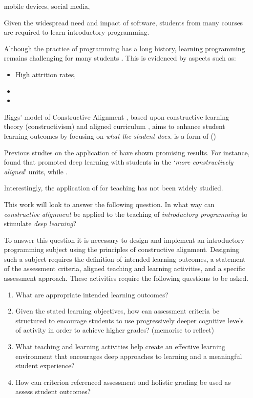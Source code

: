 mobile devices, social media,  

Given the widespread need and impact of software, students from many courses are required to learn introductory programming.

Although the practice of programming has a long history, learning programming remains challenging for many students . This is evidenced by aspects such as:
\begin{itemize}
  \item High attrition rates,
  \item 
  \item 
\end{itemize}


Biggs' model of Constructive Alignment \cite{Biggs:1996c}, based upon constructive learning theory (constructivism) and aligned curriculum \cite{Cohen:1987}, aims to enhance student learning outcomes by focusing on \emph{what the student does}. \CA is a form of  ()

Previous studies on the application of \CA have shown promising results. For instance, \citet{Wang:2012} found that \CA promoted deep learning with students in the `\emph{more constructively aligned}' units, while  .

Interestingly, the application of \CA for teaching \IP has not been widely studied.


This work will look to answer the following question. In what way can \emph{constructive alignment} be applied to the teaching of \emph{introductory programming} to stimulate \emph{deep learning}?

To answer this question it is necessary to design and implement an introductory programming subject using the principles of constructive alignment. Designing such a subject requires the definition of intended learning outcomes, a statement of the assessment criteria, aligned teaching and learning activities, and a specific assessment approach. These activities require the following questions to be asked.

\begin{enumerate}
  \item What are appropriate intended learning outcomes?
  \item Given the stated learning objectives, how can assessment criteria be structured to encourage students to use progressively deeper cognitive levels of activity in order to achieve higher grades? (memorise to reflect)
  \item What teaching and learning activities help create an effective learning environment that encourages deep approaches to learning and a meaningful student experience?
  \item How can criterion referenced assessment and holistic grading be used as assess student outcomes?
\end{enumerate}

